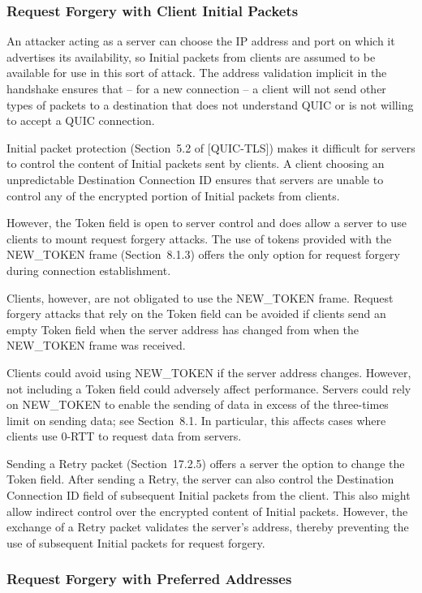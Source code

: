 \documentclass{article}
\begin{document}
\subsubsection{Request Forgery with Client Initial Packets}

An attacker acting as a server can choose the IP address and port on which it advertises its availability, so Initial packets from clients are assumed to be available for use in this sort of attack.  The address validation implicit in the handshake ensures that -- for a new connection -- a client will not send other types of packets to a destination that does not understand QUIC or is not willing to accept a QUIC connection.

Initial packet protection (Section~5.2 of [QUIC-TLS]) makes it difficult for servers to control the content of Initial packets sent by clients.  A client choosing an unpredictable Destination Connection ID ensures that servers are unable to control any of the encrypted portion of Initial packets from clients.

However, the Token field is open to server control and does allow a server to use clients to mount request forgery attacks.  The use of tokens provided with the NEW\_TOKEN frame (Section~8.1.3) offers the only option for request forgery during connection establishment.

Clients, however, are not obligated to use the NEW\_TOKEN frame. Request forgery attacks that rely on the Token field can be avoided if clients send an empty Token field when the server address has changed from when the NEW\_TOKEN frame was received.

Clients could avoid using NEW\_TOKEN if the server address changes. However, not including a Token field could adversely affect performance.  Servers could rely on NEW\_TOKEN to enable the sending of data in excess of the three-times limit on sending data; see Section~8.1.  In particular, this affects cases where clients use 0-RTT to request data from servers.

Sending a Retry packet (Section~17.2.5) offers a server the option to change the Token field.  After sending a Retry, the server can also control the Destination Connection ID field of subsequent Initial packets from the client.  This also might allow indirect control over the encrypted content of Initial packets.  However, the exchange of a Retry packet validates the server's address, thereby preventing the use of subsequent Initial packets for request forgery.

\subsubsection{Request Forgery with Preferred Addresses}
\end{document}
